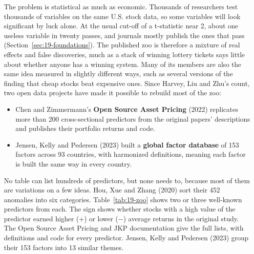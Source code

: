 The problem is statistical as much as economic. Thousands of researchers test thousands of variables on the same U.S. stock data, so some variables will look significant by luck alone. At the usual cut-off of a t-statistic near 2, about one useless variable in twenty passes, and journals mostly publish the ones that pass (Section~\ref{sec:19-foundations}). The published zoo is therefore a mixture of real effects and false discoveries, much as a stack of winning lottery tickets says little about whether anyone has a winning system. Many of its members are also the same idea measured in slightly different ways, such as several versions of the finding that cheap stocks beat expensive ones. Since Harvey, Liu and Zhu's count, two open data projects have made it possible to rebuild most of the zoo:

\begin{itemize}
  \item Chen and Zimmermann's \textbf{Open Source Asset Pricing} (2022) replicates more than 200 cross-sectional predictors from the original papers' descriptions and publishes their portfolio returns and code.
  \item Jensen, Kelly and Pedersen (2023) built a \textbf{global factor database} of 153 factors across 93 countries, with harmonized definitions, meaning each factor is built the same way in every country.
\end{itemize}

No table can list hundreds of predictors, but none needs to, because most of them are variations on a few ideas. Hou, Xue and Zhang (2020) sort their 452 anomalies into six categories. Table~\ref{tab:19-zoo} shows two or three well-known predictors from each. The sign shows whether stocks with a high value of the predictor earned higher (+) or lower ($-$) average returns in the original study. The Open Source Asset Pricing and JKP documentation give the full lists, with definitions and code for every predictor. Jensen, Kelly and Pedersen (2023) group their 153 factors into 13 similar themes.

